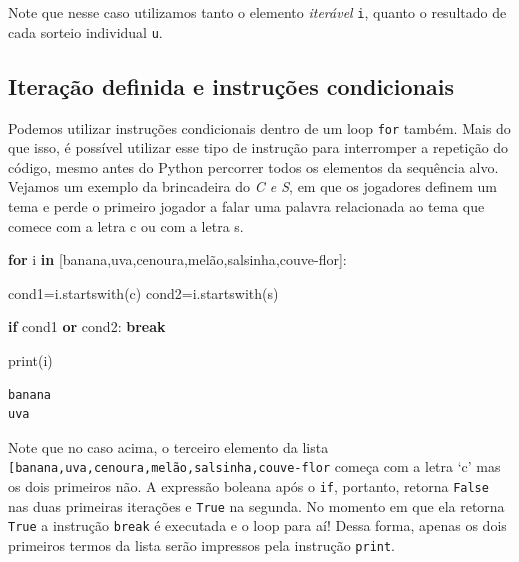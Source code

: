 \documentclass[
  brazilian,
  letterpaper,
  DIV=11,
  numbers=noendperiod]{scrreprt}
\newenvironment{Shaded}{\begin{snugshade}}{\end{snugshade}}
\newcommand{\BuiltInTok}[1]{\textcolor[rgb]{0.00,0.23,0.31}{#1}}
\newcommand{\ControlFlowTok}[1]{\textcolor[rgb]{0.00,0.23,0.31}{\textbf{#1}}}
\newcommand{\KeywordTok}[1]{\textcolor[rgb]{0.00,0.23,0.31}{\textbf{#1}}}
\newcommand{\NormalTok}[1]{\textcolor[rgb]{0.00,0.23,0.31}{#1}}
\newcommand{\OperatorTok}[1]{\textcolor[rgb]{0.37,0.37,0.37}{#1}}
\newcommand{\StringTok}[1]{\textcolor[rgb]{0.13,0.47,0.30}{#1}}
\begin{document}
Note que nesse caso utilizamos tanto o elemento \emph{iterável}
\texttt{i}, quanto o resultado de cada sorteio individual \texttt{u}.

\subsection{Iteração definida e instruções
condicionais}\label{iterauxe7uxe3o-definida-e-instruuxe7uxf5es-condicionais}

Podemos utilizar instruções condicionais dentro de um loop \texttt{for}
também. Mais do que isso, é possível utilizar esse tipo de instrução
para interromper a repetição do código, mesmo antes do Python percorrer
todos os elementos da sequência alvo. Vejamos um exemplo da brincadeira
do \emph{C e S}, em que os jogadores definem um tema e perde o primeiro
jogador a falar uma palavra relacionada ao tema que comece com a letra c
ou com a letra s.

\begin{Shaded}
\begin{Highlighting}[]
\ControlFlowTok{for}\NormalTok{ i }\KeywordTok{in}\NormalTok{ [}\StringTok{\textquotesingle{}banana\textquotesingle{}}\NormalTok{,}\StringTok{\textquotesingle{}uva\textquotesingle{}}\NormalTok{,}\StringTok{\textquotesingle{}cenoura\textquotesingle{}}\NormalTok{,}\StringTok{\textquotesingle{}melão\textquotesingle{}}\NormalTok{,}\StringTok{\textquotesingle{}salsinha\textquotesingle{}}\NormalTok{,}\StringTok{\textquotesingle{}couve{-}flor\textquotesingle{}}\NormalTok{]:}
    
\NormalTok{    cond1}\OperatorTok{=}\NormalTok{i.startswith(}\StringTok{\textquotesingle{}c\textquotesingle{}}\NormalTok{)}
\NormalTok{    cond2}\OperatorTok{=}\NormalTok{i.startswith(}\StringTok{\textquotesingle{}s\textquotesingle{}}\NormalTok{)}

    \ControlFlowTok{if}\NormalTok{ cond1 }\KeywordTok{or}\NormalTok{ cond2:}
        \ControlFlowTok{break}

    \BuiltInTok{print}\NormalTok{(i)}
\end{Highlighting}
\end{Shaded}

\begin{verbatim}
banana
uva
\end{verbatim}

Note que no caso acima, o terceiro elemento da lista
\texttt{{[}\textquotesingle{}banana\textquotesingle{},\textquotesingle{}uva\textquotesingle{},\textquotesingle{}cenoura\textquotesingle{},\textquotesingle{}melão\textquotesingle{},\textquotesingle{}salsinha\textquotesingle{},\textquotesingle{}couve-flor\textquotesingle{}{]}}
começa com a letra `c' mas os dois primeiros não. A expressão boleana
após o \texttt{if}, portanto, retorna \texttt{False} nas duas primeiras
iterações e \texttt{True} na segunda. No momento em que ela retorna
\texttt{True} a instrução \texttt{break} é executada e o loop para aí!
Dessa forma, apenas os dois primeiros termos da lista serão impressos
pela instrução \texttt{print}.
\end{document}

